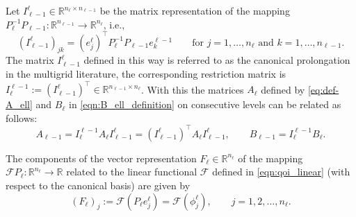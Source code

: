 \documentclass[11pt,english]{article}
\theoremstyle{plain}
\theoremstyle{plain}
\theoremstyle{plain}
\theoremstyle{plain}
\numberwithin{equation}{section}
\begin{document}
Let $I_{\ell-1}^{\ell}\in \mathbb{R}^{n_{\ell}\times n_{\ell-1}}$ be the matrix representation of the mapping $P_{\ell}^{-1}P_{\ell-1}: \mathbb{R}^{n_{\ell-1}}\rightarrow\mathbb{R}^{n_{\ell}}$, i.e.,
\begin{equation}
	(I_{\ell-1}^{\ell})_{jk} = (e_j^\ell)^\top P_{\ell}^{-1}P_{\ell-1} e_k^{\ell-1}\qquad\text{for $j=1,\dots,n_{\ell}$ and $k=1,\dots,n_{\ell-1}$}.
	\label{eqn:definition_prolongation}
\end{equation}
The matrix $I_{\ell-1}^{\ell}$ defined in this way is referred to as the canonical prolongation in the multigrid literature, the corresponding restriction matrix is $I_{\ell}^{\ell-1}:=(I_{\ell-1}^{\ell})^{\top}\in \mathbb{R}^{n_{\ell-1}\times n_{\ell}}$. With this the matrices $A_{\ell}$ defined by \eqref{eq:def-A_ell}
and $B_{\ell}$ in \eqref{eqn:B_ell_definition} on consecutive levels
can be related as follows:
\begin{equation}
	A_{\ell-1}=I_{\ell}^{\ell-1}A_{\ell}I_{\ell-1}^{\ell} =
        (I_{\ell-1}^{\ell})^\top A_{\ell}I_{\ell-1}^{\ell}, \qquad
	B_{\ell-1}= I_{\ell}^{\ell-1}B_\ell.\label{eqn:A_ell_1_B_ell_1}
\end{equation}

The components of the vector representation $F_\ell\in \mathbb{R}^{n_{\ell}}$ of the mapping $\mathcal{F}P_\ell:\mathbb{R}^{n_\ell}\rightarrow \mathbb{R}$ related to  the linear functional $\mathcal{F}$ defined in \eqref{eqn:qoi_linear} (with respect to the canonical basis) are given by
\begin{equation}
	(F_\ell)_j := \mathcal{F}(P_\ell e_j^\ell) = \mathcal{F}(\phi_j^\ell),\qquad j=1,2,\dots,n_\ell.\label{eqn:F_matrix}
\end{equation}
\end{document}
